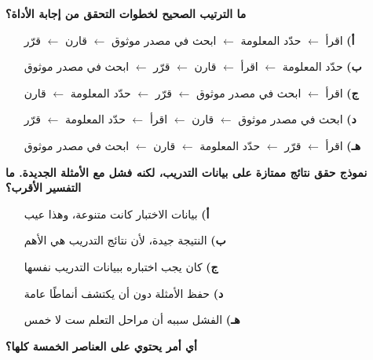 \documentclass[11pt,a4paper]{article}
\begin{document}
\begin{multicols}{2}
\noindent\begin{minipage}{\linewidth}
\hangindent=0.7cm\textbf{ما الترتيب الصحيح لخطوات التحقق من إجابة الأداة؟}
\begin{itemize}[leftmargin=0.95cm, labelsep=4pt, itemsep=0pt, topsep=2pt, parsep=0pt]
  \item[\textbf{أ)}] اقرأ $\leftarrow$ حدّد المعلومة $\leftarrow$ ابحث في مصدر موثوق $\leftarrow$ قارن $\leftarrow$ قرّر
  \item[\textbf{ب)}] حدّد المعلومة $\leftarrow$ اقرأ $\leftarrow$ قارن $\leftarrow$ قرّر $\leftarrow$ ابحث في مصدر موثوق
  \item[\textbf{ج)}] اقرأ $\leftarrow$ ابحث في مصدر موثوق $\leftarrow$ قرّر $\leftarrow$ حدّد المعلومة $\leftarrow$ قارن
  \item[\textbf{د)}] ابحث في مصدر موثوق $\leftarrow$ قارن $\leftarrow$ اقرأ $\leftarrow$ حدّد المعلومة $\leftarrow$ قرّر
  \item[\textbf{هـ)}] اقرأ $\leftarrow$ قرّر $\leftarrow$ حدّد المعلومة $\leftarrow$ قارن $\leftarrow$ ابحث في مصدر موثوق
\end{itemize}
\end{minipage}\par\vspace{7pt plus 4pt}
\noindent\begin{minipage}{\linewidth}
\hangindent=0.7cm\textbf{نموذج حقق نتائج ممتازة على بيانات التدريب، لكنه فشل مع الأمثلة الجديدة. ما التفسير الأقرب؟}
\begin{itemize}[leftmargin=0.95cm, labelsep=4pt, itemsep=0pt, topsep=2pt, parsep=0pt]
  \item[\textbf{أ)}] بيانات الاختبار كانت متنوعة، وهذا عيب
  \item[\textbf{ب)}] النتيجة جيدة، لأن نتائج التدريب هي الأهم
  \item[\textbf{ج)}] كان يجب اختباره ببيانات التدريب نفسها
  \item[\textbf{د)}] حفظ الأمثلة دون أن يكتشف أنماطًا عامة
  \item[\textbf{هـ)}] الفشل سببه أن مراحل التعلم ست لا خمس
\end{itemize}
\end{minipage}\par\vspace{7pt plus 4pt}
\noindent\begin{minipage}{\linewidth}
\hangindent=0.7cm\textbf{أي أمر يحتوي على العناصر الخمسة كلها؟}

\end{minipage}
\end{multicols}
\end{document}

